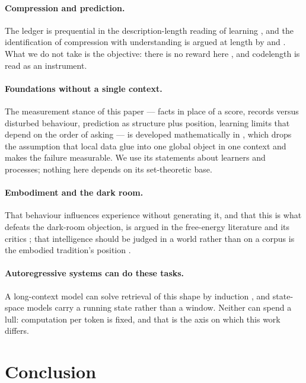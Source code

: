 \documentclass[11pt,a4paper]{article}
\theoremstyle{plain}
\theoremstyle{definition}
\theoremstyle{remark}
\begin{document}
\paragraph{Compression and prediction.} The ledger is prequential
\citep{dawid1984present,rissanen1978modeling} in the description-length reading
of learning \citep{blier2018description,grunwald2007mdl}, and the identification
of compression with understanding is argued at length by
\citet{solomonoff1964formal} and \citet{hutter2005universal}. What we do not
take is the objective: there is no reward here
\citep{sutton2018reinforcement,silver2021reward}, and codelength is read as an
instrument.

\paragraph{Foundations without a single context.} The measurement stance of
this paper --- facts in place of a score, records versus disturbed behaviour,
prediction as structure plus position, learning limits that depend on the order
of asking --- is developed mathematically in \citet{yang2026gluing}, which drops
the assumption that local data glue into one global object in one context and
makes the failure measurable. We use its statements about learners and
processes; nothing here depends on its set-theoretic base.

\paragraph{Embodiment and the dark room.} That behaviour influences experience
without generating it, and that this is what defeats the dark-room objection, is
argued in the free-energy literature and its critics
\citep{friston2010free,friston2012free,clark2013whatever}; that intelligence
should be judged in a world rather than on a corpus is the embodied tradition's
position \citep{brooks1991intelligence,lecun2022path}.

\paragraph{Autoregressive systems can do these tasks.} A long-context model can
solve retrieval of this shape by induction \citep{olsson2022context}, and
state-space models \citep{gu2023mamba} carry a running state rather than a
window. Neither can spend a lull: computation per token is fixed, and that is
the axis on which this work differs.

\section{Conclusion}
\end{document}
